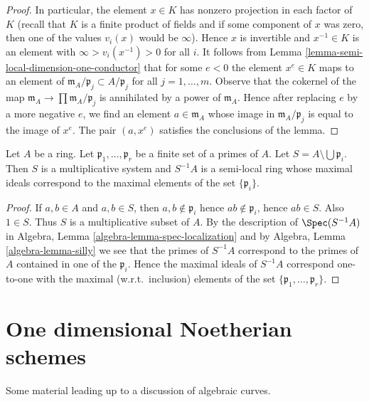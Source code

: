 \begin{proof}
\medskip\noindent
In particular, the element $x \in K$ has nonzero projection
in each factor of $K$ (recall that $K$ is a finite product of
fields and if some component of $x$ was zero, then one
of the values $v_i(x)$ would be $\infty$). Hence $x$ is
invertible and $x^{-1} \in K$ is an element with
$\infty > v_i(x^{-1}) > 0$ for all $i$. It follows from
Lemma \ref{lemma-semi-local-dimension-one-conductor} that
for some $e < 0$ the element $x^e \in K$ maps to an element of
$\mathfrak m_A/\mathfrak p_j \subset A/\mathfrak p_j$ for all
$j = 1, \ldots, m$. Observe that the cokernel of the map
$\mathfrak m_A \to \prod \mathfrak m_A/\mathfrak p_j$ is
annihilated by a power of $\mathfrak m_A$. Hence after replacing
$e$ by a more negative $e$, we find an element $a \in \mathfrak m_A$
whose image in $\mathfrak m_A/\mathfrak p_j$ is equal to
the image of $x^e$. The pair $(a, x^e)$ satisfies the
conclusions of the lemma.
\end{proof}

\begin{lemma}
\label{lemma-localization-semi-local}
Let $A$ be a ring. Let $\mathfrak p_1, \ldots, \mathfrak p_r$
be a finite set of a primes of $A$. Let
$S = A \setminus \bigcup \mathfrak p_i$. Then $S$ is a multiplicative
system and $S^{-1}A$ is a semi-local ring whose maximal ideals
correspond to the maximal elements of the set $\{\mathfrak p_i\}$.
\end{lemma}

\begin{proof}
If $a, b \in A$ and $a, b \in S$, then $a, b \not \in \mathfrak p_i$
hence $ab \not \in \mathfrak p_i$, hence $ab \in S$. Also $1 \in S$.
Thus $S$ is a multiplicative subset of $A$. By the description of
$\Spec(S^{-1}A)$ in
Algebra, Lemma \ref{algebra-lemma-spec-localization}
and by
Algebra, Lemma \ref{algebra-lemma-silly}
we see that the primes of $S^{-1}A$ correspond to the primes of
$A$ contained in one of the $\mathfrak p_i$.
Hence the maximal ideals of $S^{-1}A$ correspond one-to-one with the
maximal (w.r.t.\ inclusion) elements of the set
$\{\mathfrak p_1, \ldots, \mathfrak p_r\}$.
\end{proof}




\section{One dimensional Noetherian schemes}
\label{section-dimension-one}

\noindent
Some material leading up to a discussion of algebraic curves.


